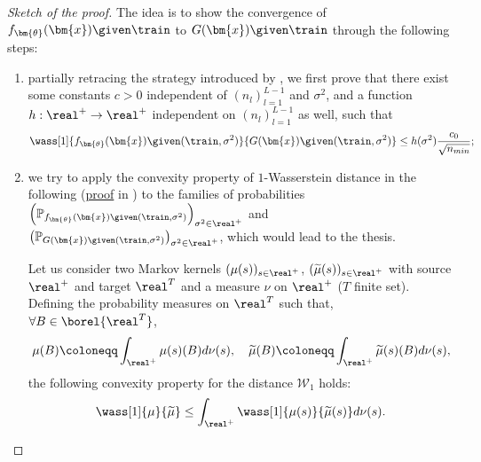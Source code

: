\begin{proof}[Sketch of the proof] 
    The idea is to show the convergence of $f_{\bm{\theta}}(\bm{x}) \given \train$ to $G(\bm{x}) \given \train$ through the following steps: 
    \begin{enumerate}
        \item partially retracing the strategy introduced by \citet{trevisan2023}, we first prove that there exist some constants $c > 0$ independent of $\left(n_l\right)_{l = 1}^{L - 1}$ and $\sigma^2$, and a function $h: \real^+ \to \real^+$ independent on $\left(n_l\right)_{l = 1}^{L - 1}$ as well, such that
        \begin{equation} \label{eq:simpleconvposteriorsigma}
            \wass[1]{f_{\bm{\theta}}(\bm{x}) \given (\train, \sigma^2)}{G(\bm{x}) \given (\train, \sigma^2)} \leq h(\sigma^2) \frac{c_0}{\sqrt{n_{min}}};
        \end{equation}
        \item we try to apply the convexity property of $1$-Wasserstein distance in the following  (\hyperlink{proof:wassconvexity}{proof} in ) to the families of probabilities $\left(\mathbb{P}_{f_{\bm{\theta}}(\bm{x}) \given (\train, \sigma^2)}\right)_{\sigma^2 \in \real^+}$ and $\left(\mathbb{P}_{G(\bm{x}) \given (\train, \sigma^2)}\right)_{\sigma^2 \in \real^+}$, which would lead to the thesis.
        \begin{proposition} \label{prop:wassconvexity}
            Let us consider two Markov kernels $(\mu(s))_{s \in \real^+}$, $(\widetilde{\mu}(s))_{s \in \real^+}$ with source $\real^+$ and target $\real^T$ and a measure $\nu$ on $\real^+$ ($T$ finite set).
            Defining the probability measures on $\real^T$ such that, $\forall B \in \borel{\real^T}$,
            \begin{equation*}
                \mu(B) \coloneqq \int_{\real^+} \mu(s)(B) d\nu(s), \quad \widetilde{\mu}(B) \coloneqq \int_{\real^+} \widetilde{\mu}(s)(B) d\nu(s),
            \end{equation*}
            the following convexity property for the distance $\mathcal{W}_1$ holds: 
            \begin{equation} \label{eq:wassconvex}
                \wass[1]{\mu}{\widetilde{\mu}} \leq \int_{\real^+} \wass[1]{\mu(s)}{\widetilde{\mu}(s)} d\nu(s).
            \end{equation}

\end{proposition}
\end{enumerate}
\end{proof}
